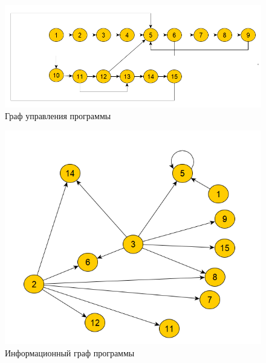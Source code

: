 \begin{figure}[h]
	\centering
    \includegraphics[height=0.20\textheight]{img/GY.png}
    \caption{Граф управления программы}
    \label{fig:gy}
\end{figure}
\begin{figure}[h]
	\centering
	\includegraphics[height=0.4\textheight]{img/IG.png}
	\caption{Информационный граф программы}
    \label{fig:ig}
\end{figure}
